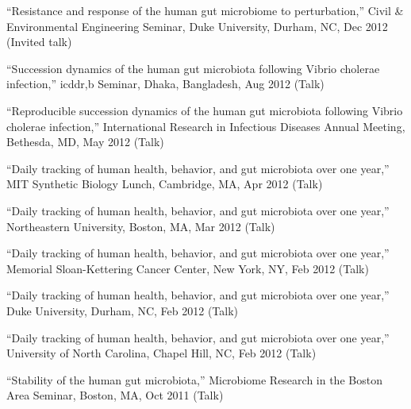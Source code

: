 \documentclass[overlapped,line,11pt]{res}
\begin{document}
\begin{resume}
\begin{revnumerate}[32]
\item {``Resistance and response of the human gut microbiome to
  perturbation,'' Civil \& Environmental Engineering Seminar, Duke University,
  Durham, NC, Dec 2012 (Invited talk)}\vspace*{0mm}

\item {``Succession dynamics of the human gut microbiota
  following Vibrio cholerae infection,'' icddr,b Seminar, Dhaka,
  Bangladesh, Aug 2012 (Talk)}
\vspace*{0mm}

\item {``Reproducible succession dynamics of the human gut microbiota
  following Vibrio cholerae infection,'' International Research in
  Infectious Diseases Annual Meeting, Bethesda, MD, May 2012 (Talk)}
\vspace*{0mm}

\item {``Daily tracking of human health, behavior, and gut microbiota
  over one year,'' MIT Synthetic Biology Lunch, Cambridge, MA, Apr 2012 (Talk)}
\vspace*{0mm}

\item {``Daily tracking of human health, behavior, and gut microbiota
  over one year,'' Northeastern University, Boston, MA, Mar 2012 (Talk)}
\vspace*{0mm}

\item {``Daily tracking of human health, behavior, and gut microbiota
  over one year,'' Memorial Sloan-Kettering Cancer Center, New York, NY,
  Feb 2012 (Talk)}
\vspace*{0mm}

\item {``Daily tracking of human health, behavior, and gut microbiota
  over one year,'' Duke University, Durham, NC, Feb 2012 (Talk)}
\vspace*{0mm}

\item {``Daily tracking of human health, behavior, and gut microbiota
  over one year,'' University of North Carolina, Chapel Hill, NC, Feb 2012 (Talk)}
\vspace*{0mm}

\item {``Stability of the human gut microbiota,'' Microbiome Research
  in the Boston Area Seminar, Boston, MA, Oct 2011 (Talk)}
\vspace*{0mm}


\end{revnumerate}
\end{resume}
\end{document}
